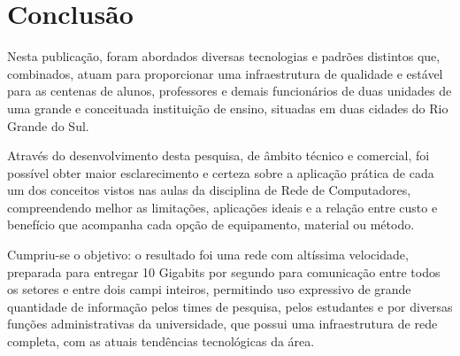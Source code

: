 \documentclass[12pt]{article}
\begin{document}
\section{Conclusão} \label{sec:conclusao}
Nesta publicação, foram abordados diversas tecnologias e padrões distintos que, combinados, atuam para proporcionar uma infraestrutura de qualidade e estável para as centenas de alunos, professores e demais funcionários de duas unidades de uma grande e conceituada instituição de ensino, situadas em duas cidades do Rio Grande do Sul.

Através do desenvolvimento desta pesquisa, de âmbito técnico e comercial, foi possível obter maior esclarecimento e certeza sobre a aplicação prática de cada um dos conceitos vistos nas aulas da disciplina de Rede de Computadores, compreendendo melhor as limitações, aplicações ideais e a relação entre custo e benefício que acompanha cada opção de equipamento, material ou método.

Cumpriu-se o objetivo: o resultado foi uma rede com altíssima velocidade, preparada para entregar 10 Gigabits por segundo para comunicação entre todos os setores e entre dois campi inteiros, permitindo uso expressivo de grande quantidade de informação pelos times de pesquisa, pelos estudantes e por diversas funções administrativas da universidade, que possui uma infraestrutura de rede completa, com as atuais tendências tecnológicas da área.



\end{document}
